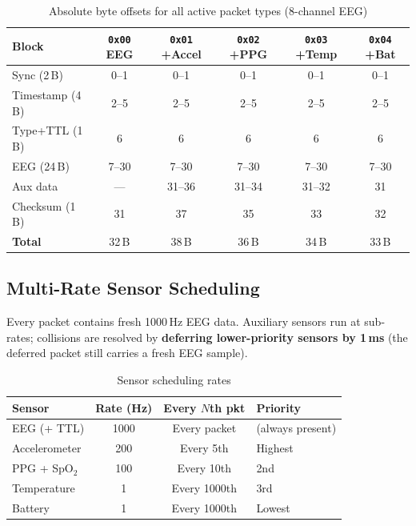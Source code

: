 \documentclass[11pt,a4paper]{article}
\newcommand{\hex}[1]{\texttt{0x#1}}
\begin{document}
\begin{table}[H]
\centering
\caption{Absolute byte offsets for all active packet types (8-channel EEG)}
\label{tab:byte-offsets}
\begin{tabular}{l c c c c c}
\toprule
\textbf{Block} & \textbf{\hex{00} EEG} & \textbf{\hex{01} +Accel}
               & \textbf{\hex{02} +PPG} & \textbf{\hex{03} +Temp}
               & \textbf{\hex{04} +Bat} \\
\midrule
Sync (2\,B)       & 0--1  & 0--1  & 0--1  & 0--1  & 0--1  \\
Timestamp (4\,B)  & 2--5  & 2--5  & 2--5  & 2--5  & 2--5  \\
Type+TTL (1\,B)   & 6     & 6     & 6     & 6     & 6     \\
EEG (24\,B)       & 7--30 & 7--30 & 7--30 & 7--30 & 7--30 \\
Aux data          & ---   & 31--36 & 31--34 & 31--32 & 31   \\
Checksum (1\,B)   & 31    & 37    & 35    & 33    & 32    \\
\midrule
\textbf{Total}    & 32\,B & 38\,B & 36\,B & 34\,B & 33\,B \\
\bottomrule
\end{tabular}
\end{table}

\subsection{Multi-Rate Sensor Scheduling}

Every packet contains fresh 1000\,Hz EEG data.  Auxiliary sensors run at
sub-rates; collisions are resolved by \textbf{deferring lower-priority
sensors by 1\,ms} (the deferred packet still carries a fresh EEG sample).

\begin{table}[H]
\centering
\caption{Sensor scheduling rates}
\label{tab:sensor-schedule}
\begin{tabular}{l c c l}
\toprule
\textbf{Sensor} & \textbf{Rate (Hz)} & \textbf{Every $N$th pkt} & \textbf{Priority} \\
\midrule
EEG (+ TTL)        & 1000 & Every packet   & (always present) \\
Accelerometer      & 200  & Every 5th      & Highest \\
PPG + SpO$_2$      & 100  & Every 10th     & 2nd \\
Temperature        & 1    & Every 1000th   & 3rd \\
Battery            & 1    & Every 1000th   & Lowest \\
\bottomrule
\end{tabular}
\end{table}
\end{document}
